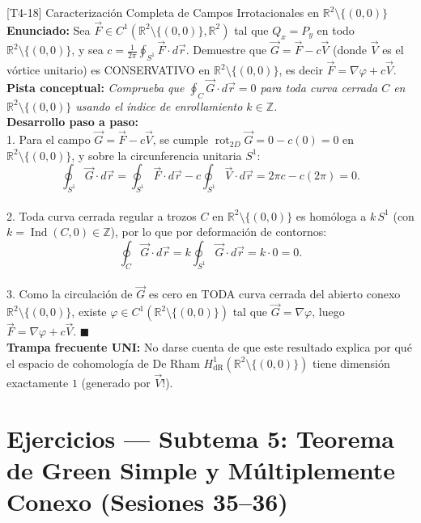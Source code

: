 \documentclass[11pt,a4paper]{article}
\begin{document}
\begin{ejerciciobox}{[T4-18] Caracterización Completa de Campos Irrotacionales en $\mathbb{R}^2 \setminus \{(0,0)\}$}
\textbf{Enunciado:} Sea $\vec{F} \in C^1(\mathbb{R}^2 \setminus \{(0,0)\}, \mathbb{R}^2)$ tal que $Q_x = P_y$ en todo $\mathbb{R}^2 \setminus \{(0,0)\}$, y sea $c = \frac{1}{2\pi}\oint_{S^1} \vec{F}\cdot d\vec{r}$. Demuestre que $\vec{G} = \vec{F} - c\vec{V}$ (donde $\vec{V}$ es el vórtice unitario) es CONSERVATIVO en $\mathbb{R}^2 \setminus \{(0,0)\}$, es decir $\vec{F} = \nabla\varphi + c\vec{V}$.\\[0.2cm]
\textbf{Pista conceptual:} \emph{Comprueba que $\oint_C \vec{G}\cdot d\vec{r} = 0$ para toda curva cerrada $C$ en $\mathbb{R}^2 \setminus \{(0,0)\}$ usando el índice de enrollamiento $k \in \mathbb{Z}$.}\\[0.2cm]
\textbf{Desarrollo paso a paso:}\\
1. Para el campo $\vec{G} = \vec{F} - c\vec{V}$, se cumple $\operatorname{rot}_{2D}\vec{G} = 0 - c(0) = 0$ en $\mathbb{R}^2 \setminus \{(0,0)\}$, y sobre la circunferencia unitaria $S^1$:\\
$$\oint_{S^1} \vec{G}\cdot d\vec{r} = \oint_{S^1} \vec{F}\cdot d\vec{r} - c\oint_{S^1} \vec{V}\cdot d\vec{r} = 2\pi c - c(2\pi) = 0.$$\\
2. Toda curva cerrada regular a trozos $C$ en $\mathbb{R}^2 \setminus \{(0,0)\}$ es homóloga a $k\,S^1$ (con $k = \operatorname{Ind}(C, 0) \in \mathbb{Z}$), por lo que por deformación de contornos:\\
$$\oint_C \vec{G}\cdot d\vec{r} = k\oint_{S^1} \vec{G}\cdot d\vec{r} = k\cdot 0 = 0.$$\\
3. Como la circulación de $\vec{G}$ es cero en TODA curva cerrada del abierto conexo $\mathbb{R}^2 \setminus \{(0,0)\}$, existe $\varphi \in C^1(\mathbb{R}^2 \setminus \{(0,0)\})$ tal que $\vec{G} = \nabla\varphi$, luego $\vec{F} = \nabla\varphi + c\vec{V}$. $\blacksquare$\\[0.2cm]
\textbf{Trampa frecuente UNI:} No darse cuenta de que este resultado explica por qué el espacio de cohomología de De Rham $H^1_{\text{dR}}(\mathbb{R}^2 \setminus \{(0,0)\})$ tiene dimensión exactamente $1$ (generado por $\vec{V}$!).
\end{ejerciciobox}

\section{Ejercicios --- Subtema 5: Teorema de Green Simple y Múltiplemente Conexo (Sesiones 35--36)}
\end{document}
